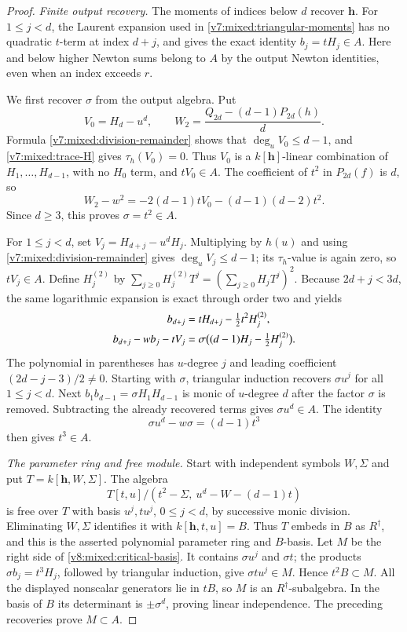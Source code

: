 \documentclass[10pt,fleqn]{article}
\numberwithin{equation}{section}
\begin{document}
\begin{proof}
\textit{Finite output recovery.}
The moments of indices below $d$ recover $\mathbf h$.  For
$1\le j<d$, the Laurent expansion used in
\eqref{v7:mixed:triangular-moments} has no quadratic $t$-term at
index $d+j$, and gives the exact identity $b_j=tH_j\in A$.
Here and below higher Newton sums belong to $A$ by the output Newton
identities, even when an index exceeds $r$.

We first recover $\sigma$ from the output algebra.  Put
\[
 V_0=H_d-u^d,\qquad
 W_2=\frac{Q_{2d}-(d-1)P_{2d}(h)}d.
\]
Formula \eqref{v7:mixed:division-remainder} shows that
$\deg_u V_0\le d-1$, and \eqref{v7:mixed:trace-H} gives
$\tau_h(V_0)=0$.  Thus $V_0$ is a $k[\mathbf h]$-linear combination of
$H_1,\ldots,H_{d-1}$, with no $H_0$ term, and $tV_0\in A$.
The coefficient of $t^2$ in $P_{2d}(f)$ is $d$, so
\begin{equation}\label{v8:mixed:critical-square}
 W_2-w^2=-2(d-1)tV_0-(d-1)(d-2)t^2.
\end{equation}
Since $d\ge3$, this proves $\sigma=t^2\in A$.

For $1\le j<d$, set $V_j=H_{d+j}-u^dH_j$.
Multiplying by $h(u)$ and using
\eqref{v7:mixed:division-remainder} gives $\deg_u V_j\le d-1$;
its $\tau_h$-value is again zero, so $tV_j\in A$.
Define $H_j^{(2)}$ by
$\sum_{j\ge0}H_j^{(2)}T^j=(\sum_{j\ge0}H_jT^j)^2$.
Because $2d+j<3d$, the same logarithmic expansion is exact through
order two and yields
\begin{align}
 b_{d+j}&=tH_{d+j}-\tfrac12t^2H_j^{(2)},\notag\\
 b_{d+j}-wb_j-tV_j
   &=\sigma\bigl((d-1)H_j-\tfrac12H_j^{(2)}\bigr).
 \label{v8:mixed:critical-triangular}
\end{align}
The polynomial in parentheses has $u$-degree $j$ and leading
coefficient $(2d-j-3)/2\ne0$.  Starting with $\sigma$, triangular
induction recovers $\sigma u^j$ for all $1\le j<d$.
Next $b_1b_{d-1}=\sigma H_1H_{d-1}$ is monic of $u$-degree $d$
after the factor $\sigma$ is removed.  Subtracting the already
recovered terms gives $\sigma u^d\in A$.  The identity
\[
 \sigma u^d-w\sigma=(d-1)t^3
\]
then gives $t^3\in A$.

\textit{The parameter ring and free module.}
Start with independent symbols $W,\Sigma$ and put
$T=k[\mathbf h,W,\Sigma]$.  The algebra
\[
 T[t,u]/(t^2-\Sigma,\ u^d-W-(d-1)t)
\]
is free over $T$ with basis $u^j,tu^j$, $0\le j<d$, by successive
monic division.  Eliminating $W,\Sigma$ identifies it with
$k[\mathbf h,t,u]=B$.  Thus $T$ embeds in $B$ as $R^\dagger$, and
this is the asserted polynomial parameter ring and $B$-basis.
Let $M$ be the right side of
\eqref{v8:mixed:critical-basis}.  It contains $\sigma u^j$ and
$\sigma t$; the products $\sigma b_j=t^3H_j$, followed by triangular
induction, give $\sigma tu^j\in M$.  Hence $t^2B\subset M$.
All the displayed nonscalar generators lie in $tB$, so $M$ is an
$R^\dagger$-subalgebra.  In the basis of $B$ its determinant is
$\pm\sigma^d$, proving linear independence.  The preceding recoveries
prove $M\subset A$.


\end{proof}
\end{document}
